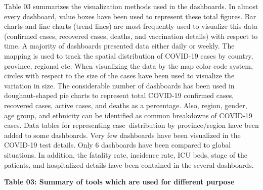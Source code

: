 \documentclass[
]{article}
\begin{document}
Table 03 summarizes the visualization methods used in the dashboards. In
almost every dashboard, value boxes have been used to represent these
total figures. Bar charts and line charts (trend lines) are most
frequently used to visualize this data (confirmed cases, recovered
cases, deaths, and vaccination details) with respect to time. A majority
of dashboards presented data either daily or weekly. The mapping is used
to track the spatial distribution of COVID-19 cases by country,
province, regional etc. When visualizing the data by the map color code
system, circles with respect to the size of the cases have been used to
visualize the variation in size. The considerable number of dashboards
has been used in doughnut-shaped pie charts to represent total COVID-19
confirmed cases, recovered cases, active cases, and deaths as a
percentage. Also, region, gender, age group, and ethnicity can be
identified as common breakdowns of COVID-19 cases. Data tables for
representing case~distribution by province/region have been added to
some dashboards. Very few dashboards have been visualized in the
COVID-19 test details. Only 6 dashboards have been compared to global
situations. In addition, the fatality rate, incidence rate, ICU beds,
stage of the patients, and hospitalized details have been contained in
the several dashboards.\hfill\break

\textbf{Table 03: Summary of tools which are used for different purpose}
\end{document}
